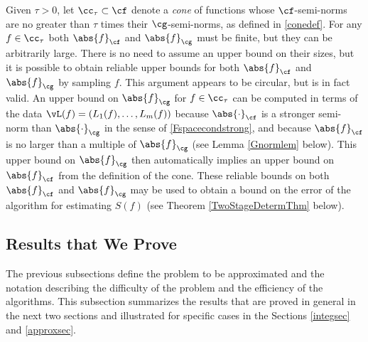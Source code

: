 \documentclass[]{elsarticle}
\theoremstyle{definition}
\theoremstyle{remark}
\newcommand{\Fnorm}[1]{\abs{#1}_{\cf}}
\newcommand{\Gnorm}[1]{\abs{#1}_{\cg}}
\begin{document}
Given $\tau>0$, let $\cc_{\tau} \subset \cf$ denote a \emph{cone} of functions whose $\cf$-semi-norms are no greater than $\tau$ times their $\cg$-semi-norms, as defined in \eqref{conedef}.  For any $f \in \cc_{\tau}$ both $\Fnorm{f}$ and $\Gnorm{f}$ must be finite, but they can be arbitrarily large.  There is no need to assume an upper bound on their sizes, but it is possible to obtain reliable upper bounds for both $\Fnorm{f}$ and $\Gnorm{f}$ by sampling $f$.  This argument appears to be circular, but is in fact valid.  An upper bound on $\Gnorm{f}$ for $f \in \cc_{\tau}$ can be computed in terms of the data $\vL(f)=(L_1(f), \ldots, L_m(f))$ because $\Fnorm{\cdot}$ is a stronger semi-norm than $\Gnorm{\cdot}$ in the sense of \eqref{Fspacecondstrong}, and because $\Fnorm{f}$ is no larger than a multiple of $\Gnorm{f}$ (see Lemma \ref{Gnormlem} below). This upper bound on $\Gnorm{f}$ then automatically implies an upper bound on $\Fnorm{f}$ from the definition of the cone. These reliable bounds on both $\Fnorm{f}$ and $\Gnorm{f}$ may be used to obtain a bound on the error of the algorithm for estimating $S(f)$  (see Theorem \ref{TwoStageDetermThm} below).

\subsection{Results that We Prove}  The previous subsections define the problem to be approximated and the notation describing the difficulty of the problem and the efficiency of the algorithms.  This subsection summarizes the results that are proved in general in the next two sections and illustrated for specific cases in the Sections \ref{integsec} and \ref{approxsec}.
\end{document}
